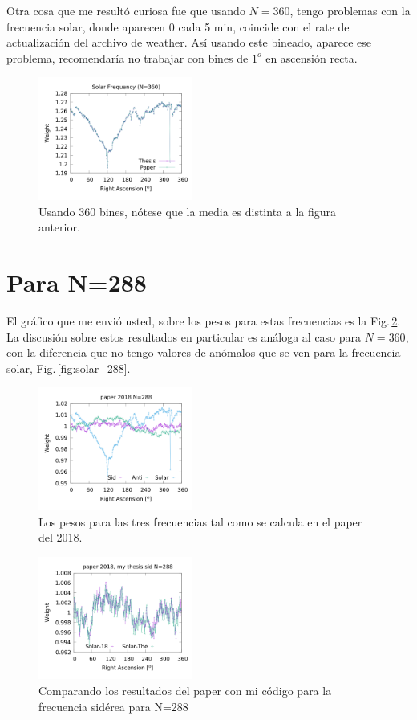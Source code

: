 Otra cosa que me resultó curiosa fue que usando $N=360$, tengo problemas con la frecuencia solar, donde aparecen 0 cada 5 min, coincide con el rate de actualización del archivo de weather. Así usando este bineado, aparece ese problema, recomendaría no trabajar con bines de $1^o$ en ascensión recta.
\begin{figure}[H]
	\centering
	\includegraphics[width=0.45\textwidth]{solar_my_and_paper_in_360_2.png}
	\caption{Usando 360 bines, nótese que la media es distinta a la figura anterior.}
	\label{fig:solar_360}
\end{figure}

\section{Para N=288}

El gráfico que me envió usted, sobre los pesos para estas frecuencias es la Fig.\,\ref{fig:all_288_paper}. La discusión sobre estos resultados en particular es análoga al caso para $N=360$, con la diferencia que no tengo valores de anómalos que se ven para la frecuencia solar, Fig.\,\ref{fig:solar_288}.
\begin{figure}[H]
	\centering
	\includegraphics[width=0.45\textwidth]{solar_anti_sid_paper2018_in_288.png}
	\caption{Los pesos para las tres frecuencias tal como se calcula en el paper del 2018.}
	\label{fig:all_288_paper}
\end{figure}



\begin{figure}[H]
	\centering
	\includegraphics[width=0.45\textwidth]{sidereal_my_and_paper_in_288.png}
	\caption{Comparando los resultados del paper con mi código para la frecuencia sidérea para N=288}
	\label{fig:sidereal_288}
\end{figure}


